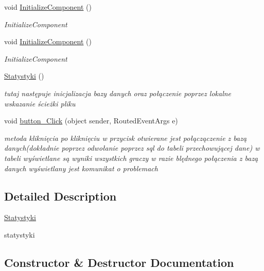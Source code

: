 \begin{DoxyCompactItemize}
void \mbox{\hyperlink{classprojekt_1_1_statystyki_a6f4801d8176e1c715f5260bf055b0915}{Initialize\+Component}} ()
\begin{DoxyCompactList}\small\item\em Initialize\+Component \end{DoxyCompactList}\item 
void \mbox{\hyperlink{classprojekt_1_1_statystyki_a6f4801d8176e1c715f5260bf055b0915}{Initialize\+Component}} ()
\begin{DoxyCompactList}\small\item\em Initialize\+Component \end{DoxyCompactList}\item 
\mbox{\hyperlink{classprojekt_1_1_statystyki_ae90a003d3720200a8ef9b33e6f9f0225}{Statystyki}} ()
\begin{DoxyCompactList}\small\item\em tutaj następuje inicjalizacja bazy danych oraz połączenie poprzez lokalne wskazanie ścieżki pliku \end{DoxyCompactList}\item 
void \mbox{\hyperlink{classprojekt_1_1_statystyki_ad332fb6b7fc8e823ca0f23f3bb9fdc7c}{button\+\_\+\+Click}} (object sender, Routed\+Event\+Args e)
\begin{DoxyCompactList}\small\item\em metoda kliknięcia po kliknięciu w przycisk otwierane jest połączączenie z bazą danych(dokładnie poprzez odwołanie poprzez sql do tabeli przechowującej dane) w tabeli wyświetlane są wyniki wszystkich graczy w razie blędnego połączenia z bazą danych wyświetlany jest komunikat o problemach \end{DoxyCompactList}\end{DoxyCompactItemize}


\subsection{Detailed Description}
\mbox{\hyperlink{classprojekt_1_1_statystyki}{Statystyki}} 

statystyki 

\subsection{Constructor \& Destructor Documentation}
\mbox{\label{classprojekt_1_1_statystyki_ae90a003d3720200a8ef9b33e6f9f0225}} 
